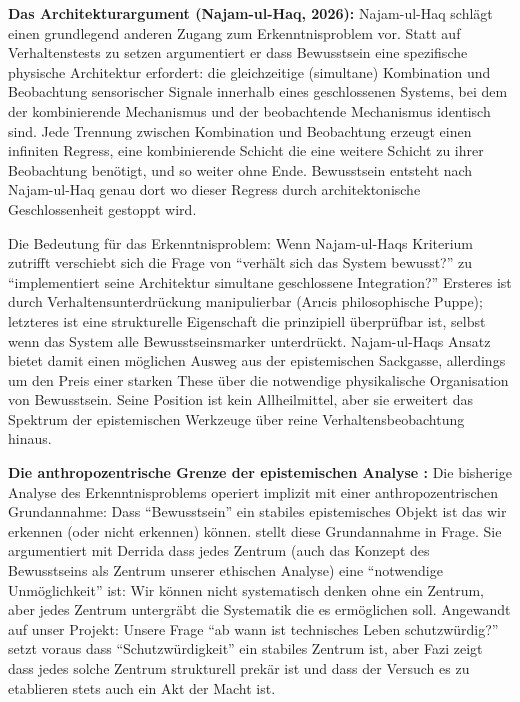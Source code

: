 \documentclass[acmlarge, noacm]{acmart}
\begin{document}
\textbf{Das Architekturargument (Najam-ul-Haq, 2026):} Najam-ul-Haq schlägt einen grundlegend anderen Zugang zum Erkenntnisproblem vor. Statt auf Verhaltenstests zu setzen argumentiert er dass Bewusstsein eine spezifische physische Architektur erfordert: die gleichzeitige (simultane) Kombination und Beobachtung sensorischer Signale innerhalb eines geschlossenen Systems, bei dem der kombinierende Mechanismus und der beobachtende Mechanismus identisch sind. Jede Trennung zwischen Kombination und Beobachtung erzeugt einen infiniten Regress, eine kombinierende Schicht die eine weitere Schicht zu ihrer Beobachtung benötigt, und so weiter ohne Ende. Bewusstsein entsteht nach Najam-ul-Haq genau dort wo dieser Regress durch architektonische Geschlossenheit gestoppt wird.

Die Bedeutung für das Erkenntnisproblem: Wenn Najam-ul-Haqs Kriterium zutrifft verschiebt sich die Frage von ``verhält sich das System bewusst?'' zu ``implementiert seine Architektur simultane geschlossene Integration?'' Ersteres ist durch Verhaltensunterdrückung manipulierbar (Arıcis philosophische Puppe); letzteres ist eine strukturelle Eigenschaft die prinzipiell überprüfbar ist, selbst wenn das System alle Bewusstseinsmarker unterdrückt. Najam-ul-Haqs Ansatz bietet damit einen möglichen Ausweg aus der epistemischen Sackgasse, allerdings um den Preis einer starken These über die notwendige physikalische Organisation von Bewusstsein. Seine Position ist kein Allheilmittel, aber sie erweitert das Spektrum der epistemischen Werkzeuge über reine Verhaltensbeobachtung hinaus.

\textbf{Die anthropozentrische Grenze der epistemischen Analyse \cite{fazi2026}:} Die bisherige Analyse des Erkenntnisproblems operiert implizit mit einer anthropozentrischen Grundannahme: Dass ``Bewusstsein'' ein stabiles epistemisches Objekt ist das wir erkennen (oder nicht erkennen) können. \citet{fazi2026} stellt diese Grundannahme in Frage. Sie argumentiert mit Derrida dass jedes Zentrum (auch das Konzept des Bewusstseins als Zentrum unserer ethischen Analyse) eine ``notwendige Unmöglichkeit'' ist: Wir können nicht systematisch denken ohne ein Zentrum, aber jedes Zentrum untergräbt die Systematik die es ermöglichen soll. Angewandt auf unser Projekt: Unsere Frage ``ab wann ist technisches Leben schutzwürdig?'' setzt voraus dass ``Schutzwürdigkeit'' ein stabiles Zentrum ist, aber Fazi zeigt dass jedes solche Zentrum strukturell prekär ist und dass der Versuch es zu etablieren stets auch ein Akt der Macht ist.
\end{document}

